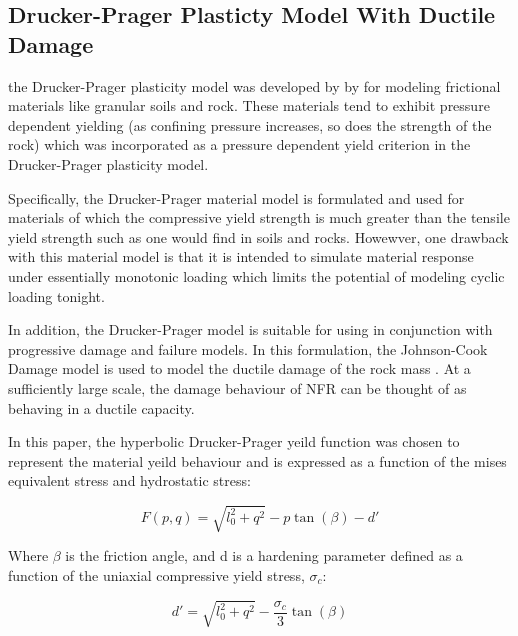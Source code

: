 \subsection{Drucker-Prager Plasticty Model With Ductile Damage}

the Drucker-Prager plasticity model was developed by by \citet{drucker_implications_1950} for modeling frictional materials like granular soils and rock. These materials tend  to exhibit pressure dependent yielding (as confining
pressure increases, so does the strength of the rock) which was incorporated as a pressure dependent yield criterion in the Drucker-Prager plasticity model. 

Specifically, the Drucker-Prager material model is formulated and used for materials of which the compressive yield strength is much greater than the tensile yield strength such as one would find in soils and rocks. Howewver, one drawback with this material model is that it is intended to simulate material response under essentially monotonic loading which limits the potential of modeling cyclic loading tonight.

In addition, the Drucker-Prager model is suitable for using in conjunction with progressive damage and failure models. In this formulation, the Johnson-Cook Damage model is used to model the ductile damage of the rock mass \cite{johnson_fracture_1985}. At a sufficiently large scale, the damage behaviour of NFR can be thought of as behaving in a ductile capacity. 




In this paper, the hyperbolic Drucker-Prager yeild function was chosen to represent the material yeild behaviour and is expressed as a function of the mises equivalent stress and hydrostatic stress:

\begin{equation}
F\left(p,q\right)=\sqrt{l_{0}^{2}+q^{2}}-p\tan\left(\beta\right)-d'\label{eqn:druc2}
\end{equation}

Where $\beta$ is the friction angle, and d is a hardening parameter defined as a function of the uniaxial compressive yield stress, $\sigma_c$:

\begin{equation}
d'=\sqrt{l_{0}^{2}+q^{2}}-\frac{\sigma_c}{3}\tan\left(\beta\right)
\label{eqn:druc2-2}
\end{equation}

